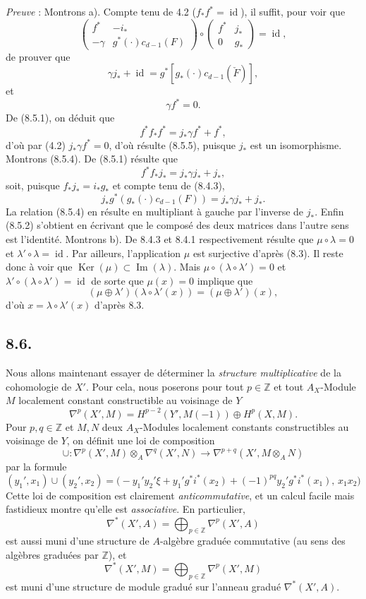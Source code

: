 \documentclass[11pt]{article}
\providecommand{\Ker}{\operatorname{Ker}}
\providecommand{\Ker}{\operatorname{Ker}}
\providecommand{\Ker}{\operatorname{Ker}}
\begin{document}
\emph{Preuve} : Montrons a). Compte tenu de 4.2 ($f_*f^*=\operatorname{id}$), il suffit, pour voir que
\[
\begin{pmatrix}
f^*&-i_*\\
-\gamma&g^*(\cdot)c_{d-1}(F)
\end{pmatrix}
\circ
\begin{pmatrix}
f^*&j_*\\
0&g_*
\end{pmatrix}
=\operatorname{id},
\]
de prouver que
\[
\gamma j_*+\operatorname{id}=g^*[g_*(\cdot)c_{d-1}(\check F)],
\tag{8.5.4}
\]
et
\[
\gamma f^*=0.
\tag{8.5.5}
\]
De (8.5.1), on déduit que
\[
f^*f_*f^*=j_*\gamma f^*+f^*,
\]
d'où par (4.2) $j_*\gamma f^*=0$, d'où résulte (8.5.5), puisque $j_*$ est un isomorphisme. Montrons (8.5.4). De (8.5.1) résulte que
\[
f^*f_*j_*=j_*\gamma j_*+j_*,
\]
soit, puisque $f_*j_*=i_*g_*$ et compte tenu de (8.4.3),
\[
j_*g^*(g_*(\cdot)c_{d-1}(F))=j_*\gamma j_*+j_*.
\]
La relation (8.5.4) en résulte en multipliant à gauche par l'inverse de $j_*$. Enfin (8.5.2) s'obtient en écrivant que le composé des deux matrices dans l'autre sens est l'identité. Montrons b). De 8.4.3 et 8.4.1 respectivement résulte que $\mu\circ\lambda=0$ et $\lambda'\circ\lambda=\operatorname{id}$. Par ailleurs, l'application $\mu$ est surjective d'après (8.3). Il reste donc à voir que $\Ker(\mu)\subset\operatorname{Im}(\lambda)$. Mais $\mu\circ(\lambda\circ\lambda')=0$ et $\lambda'\circ(\lambda\circ\lambda')=\operatorname{id}$ de sorte que $\mu(x)=0$ implique que
\[
(\mu\oplus\lambda')(\lambda\circ\lambda'(x))=(\mu\oplus\lambda')(x),
\]
d'où $x=\lambda\circ\lambda'(x)$ d'après 8.3.

\subsection*{8.6.}

Nous allons maintenant essayer de déterminer la \emph{structure multiplicative} de la cohomologie de $X'$. Pour cela, nous poserons pour tout $p\in\mathbb Z$ et tout $A_X$-Module $M$ localement constant constructible au voisinage de $Y$
\[
\nabla^p(X',M)=H^{p-2}(Y',M(-1))\oplus H^p(X,M).
\]
Pour $p,q\in\mathbb Z$ et $M,N$ deux $A_X$-Modules localement constants constructibles au voisinage de $Y$, on définit une loi de composition
\[
\cup:\nabla^p(X',M)\otimes_A\nabla^q(X',N)\to
\nabla^{p+q}(X',M\otimes_A N)
\tag{8.6.1}
\]
par la formule
\[
(y_1',x_1)\cup(y_2',x_2)=
\bigl(-y_1'y_2'\xi+y_1'g^*i^*(x_2)+(-1)^{pq}y_2'g^*i^*(x_1),\,x_1x_2\bigr)
\tag{8.6.2}
\]
Cette loi de composition est clairement \emph{anticommutative}, et un calcul facile mais fastidieux montre qu'elle est \emph{associative}. En particulier,
\[
\nabla^*(X',A)=\bigoplus_{p\in\mathbb Z}\nabla^p(X',A)
\]
est
aussi muni d'une structure de $A$-algèbre graduée commutative (au sens des algèbres graduées par $\mathbb Z$), et
\[
\nabla^*(X',M)=\bigoplus_{p\in\mathbb Z}\nabla^p(X',M)
\]
est muni d'une structure de module gradué sur l'anneau gradué $\nabla^*(X',A)$.
\end{document}

